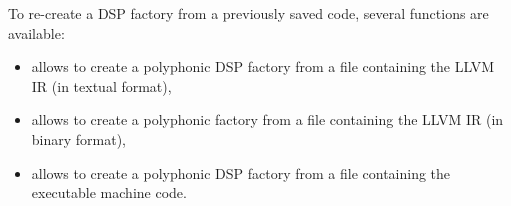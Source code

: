 To re-create a DSP factory from a previously saved code, several functions are available:

\begin{itemize}
\item {} allows to create a polyphonic DSP factory from a file containing the LLVM IR (in textual format),
\item {} allows to create a polyphonic  factory from a file containing the LLVM IR (in binary format),
\item {} allows to create a polyphonic DSP factory from a file containing the executable machine code.
\end{itemize}
